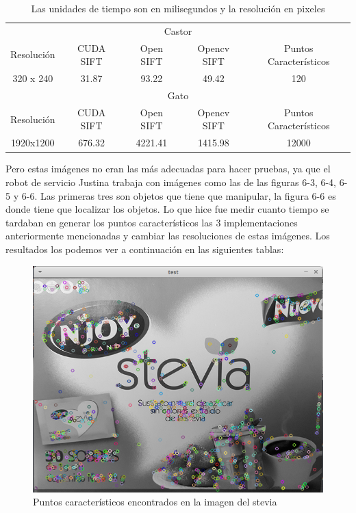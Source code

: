 \begin{table}[htb]
\centering
\begin{tabular}{|c|c|c|c|c|}
\hline

\multicolumn{5}{|c|}{Castor} \\
\cline{1-5}
Resolución & CUDA SIFT & Open SIFT & Opencv SIFT & Puntos Característicos\\
\hline \hline
 320 x 240  & 31.87   &   93.22  &  49.42   & 120\\ \cline{1-5}
\hline \hline
\multicolumn{5}{|c|}{Gato} \\
\cline{1-5}
Resolución & CUDA SIFT & Open SIFT & Opencv SIFT & Puntos Característicos\\
\hline \hline
1920x1200  & 676.32 &  4221.41 & 1415.98   & 12000\\ \cline{1-5}


\end{tabular}
\caption{Las unidades de tiempo son en milisegundos y la resolución en pixeles}
\label{tabla:final}
\end{table}






\pagebreak


Pero estas imágenes no eran las más adecuadas para hacer pruebas, ya que el robot de servicio Justina trabaja con imágenes como las de las figuras 6-3, 6-4, 6-5 y 6-6. Las primeras tres son objetos que tiene que manipular, la figura 6-6 es donde tiene que localizar los objetos.
Lo que hice fue medir cuanto tiempo se tardaban en generar los puntos característicos las 3 implementaciones anteriormente mencionadas y cambiar las resoluciones de estas imágenes. Los resultados los podemos ver a continuación en las siguientes tablas:


\begin{figure}[ph]
			\centering
				\includegraphics[scale=0.70]{img/stevia.png}
			\caption{Puntos característicos encontrados en la imagen del stevia}
\end{figure}


